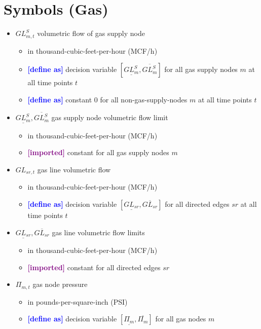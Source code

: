 \documentclass{article}
\newcommand{\lo}[1]{\underline{#1}}
\newcommand{\hi}[1]{\overline{#1}}
\newcommand{\define}{\textcolor{blue}{\textbf{[define as] }}}
\newcommand{\imported}{\textcolor{purple}{\textbf{[imported] }}}
\begin{document}
\section{Symbols (Gas)}
\begin{itemize}
\item $GL^S_{m,t}$ volumetric flow of gas supply node
  \begin{itemize}
  \item in thousand-cubic-feet-per-hour (MCF/h)
  \item \define decision variable $[\lo{GL^S_m}, \hi{GL^S_m}]$ for all gas
    supply nodes $m$ at all time points $t$
  \item \define constant $0$ for all non-gas-supply-nodes $m$ at all time
    points $t$
  \end{itemize}

\item $\lo{GL^S_m}, \hi{GL^S_m}$ gas supply node volumetric flow limit
  \begin{itemize}
  \item in thousand-cubic-feet-per-hour (MCF/h)
  \item \imported constant for all gas supply nodes $m$
  \end{itemize}

\item $GL_{sr,t}$ gas line volumetric flow
  \begin{itemize}
  \item in thousand-cubic-feet-per-hour (MCF/h)
  \item \define decision variable $[\lo{GL_{sr}}, \hi{GL_{sr}}]$ for all
    directed edges $sr$ at all time points $t$
  \end{itemize}

\item $\lo{GL_{sr}}, \hi{GL_{sr}}$ gas line volumetric flow limits
  \begin{itemize}
  \item in thousand-cubic-feet-per-hour (MCF/h)
  \item \imported constant for all directed edges $sr$
  \end{itemize}

\item $\Pi_{m,t}$ gas node pressure
  \begin{itemize}
  \item in pounds-per-square-inch (PSI)
  \item \define decision variable $[\lo{\Pi_m}, \hi{\Pi_m}]$ for all gas nodes
    $m$
  \end{itemize}


\end{itemize}
\end{document}

